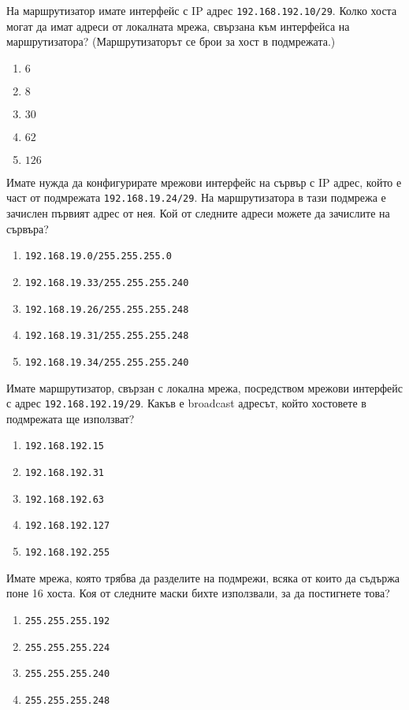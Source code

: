 \begin{q}
  На маршрутизатор имате интерфейс с IP адрес \texttt{192.168.192.10/29}. Колко
  хоста могат да имат адреси от локалната мрежа, свързана към интерфейса на
  маршрутизатора? (Маршрутизаторът се брои за хост в подмрежата.)
  \begin{enumerate}
  \item $6$
  \item $8$
  \item $30$
  \item $62$
  \item $126$
  \end{enumerate}
\end{q}

\begin{q}
  Имате нужда да конфигурирате мрежови интерфейс на сървър с IP адрес, който е
  част от подмрежата \texttt{192.168.19.24/29}. На маршрутизатора в тази
  подмрежа е зачислен първият адрес от нея. Кой от следните адреси можете да
  зачислите на сървъра?
  \begin{enumerate}
  \item \texttt{192.168.19.0/255.255.255.0}
  \item \texttt{192.168.19.33/255.255.255.240}
  \item \texttt{192.168.19.26/255.255.255.248}
  \item \texttt{192.168.19.31/255.255.255.248}
  \item \texttt{192.168.19.34/255.255.255.240}
  \end{enumerate}
\end{q}

\begin{q}
  Имате маршрутизатор, свързан с локална мрежа, посредством мрежови интерфейс с
  адрес \texttt{192.168.192.19/29}. Какъв е broadcast адресът, който хостовете в
  подмрежата ще използват?
  \begin{enumerate}
  \item \texttt{192.168.192.15}
  \item \texttt{192.168.192.31}
  \item \texttt{192.168.192.63}
  \item \texttt{192.168.192.127}
  \item \texttt{192.168.192.255}
  \end{enumerate}
\end{q}

\begin{q}
  Имате мрежа, която трябва да разделите на подмрежи, всяка от които да съдържа
  поне 16 хоста. Коя от следните маски бихте използвали, за да постигнете това?
  \begin{enumerate}
  \item \texttt{255.255.255.192}
  \item \texttt{255.255.255.224}
  \item \texttt{255.255.255.240}
  \item \texttt{255.255.255.248}
  \end{enumerate}
\end{q}

